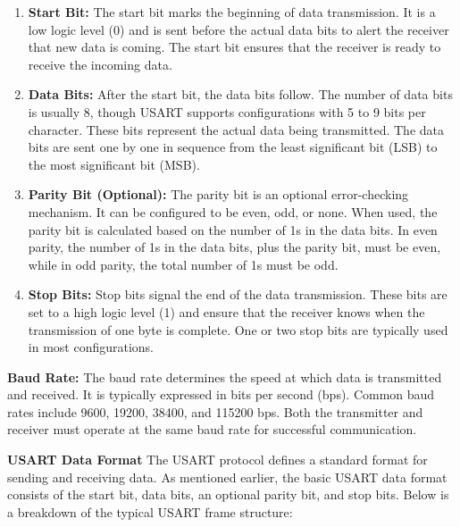 \documentclass{article}
\numberwithin{equation}{section}
\numberwithin{figure}{section}
\numberwithin{table}{section}
\begin{document}
\begin{enumerate}
    \item \textbf{Start Bit:} The start bit marks the beginning of data transmission. It is a low logic level (0) and is sent before the actual data bits to alert the receiver that new data is coming. The start bit ensures that the receiver is ready to receive the incoming data.
    
    \item \textbf{Data Bits:} After the start bit, the data bits follow. The number of data bits is usually 8, though USART supports configurations with 5 to 9 bits per character. These bits represent the actual data being transmitted. The data bits are sent one by one in sequence from the least significant bit (LSB) to the most significant bit (MSB).
    
    \item \textbf{Parity Bit (Optional):} The parity bit is an optional error-checking mechanism. It can be configured to be even, odd, or none. When used, the parity bit is calculated based on the number of 1s in the data bits. In even parity, the number of 1s in the data bits, plus the parity bit, must be even, while in odd parity, the total number of 1s must be odd.
    
    \item \textbf{Stop Bits:} Stop bits signal the end of the data transmission. These bits are set to a high logic level (1) and ensure that the receiver knows when the transmission of one byte is complete. One or two stop bits are typically used in most configurations.
\end{enumerate}

\textbf{Baud Rate:} The baud rate determines the speed at which data is transmitted and received. It is typically expressed in bits per second (bps). Common baud rates include 9600, 19200, 38400, and 115200 bps. Both the transmitter and receiver must operate at the same baud rate for successful communication.

\textbf{USART Data Format}
The USART protocol defines a standard format for sending and receiving data. As mentioned earlier, the basic USART data format consists of the start bit, data bits, an optional parity bit, and stop bits. Below is a breakdown of the typical USART frame structure:
\end{document}

